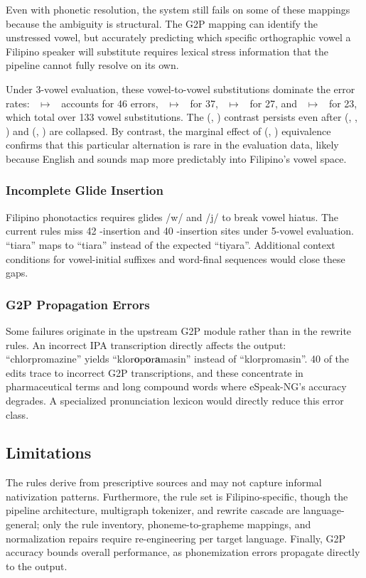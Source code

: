 Even with phonetic resolution, the system still fails on some of these mappings
because the ambiguity is structural. The G2P mapping can identify the
unstressed vowel, but accurately predicting which specific orthographic vowel a
Filipino speaker will substitute requires lexical stress information that the
pipeline cannot fully resolve on its own.

Under 3-vowel evaluation, these vowel-to-vowel substitutions dominate the error
rates: ~$\mapsto$~ accounts for 46 errors, ~$\mapsto$~
for 37, ~$\mapsto$~ for 27, and ~$\mapsto$~ for 23,
which total over 133 vowel substitutions. The (, ) contrast
persists even after (, , ) and (, ) are
collapsed. By contrast, the marginal effect of (, ) equivalence
confirms that this particular alternation is rare in the evaluation data,
likely because English  and  sounds map more predictably into
Filipino's vowel space.

\subsubsection{Incomplete Glide Insertion}

Filipino phonotactics requires glides /w/ and /j/ to break vowel hiatus. The
current rules miss 42 -insertion and 40 -insertion sites under
5-vowel evaluation. ``tiara'' maps to ``tiara'' instead of the expected
``tiyara''. Additional context conditions for vowel-initial suffixes and
word-final sequences would close these gaps.

\subsubsection{G2P Propagation Errors}

Some failures originate in the upstream G2P module rather than in the rewrite
rules. An incorrect IPA transcription directly affects the output:
``chlorpromazine'' yields ``klor\textbf{o}p\textbf{o}r\textbf{a}masin'' instead
of ``klorpromasin''. 40 of the edits trace to incorrect G2P transcriptions, and
these concentrate in pharmaceutical terms and long compound words where
eSpeak-NG's accuracy degrades. A specialized pronunciation lexicon would
directly reduce this error class.

\subsection{Limitations}

The rules derive from
prescriptive sources and may not capture informal nativization patterns.
Furthermore, the rule set is Filipino-specific, though the pipeline architecture,
multigraph tokenizer, and rewrite cascade are language-general; only the rule
inventory, phoneme-to-grapheme mappings, and normalization repairs require
re-engineering per target language. Finally, G2P accuracy bounds overall
performance, as phonemization errors propagate directly to the output.